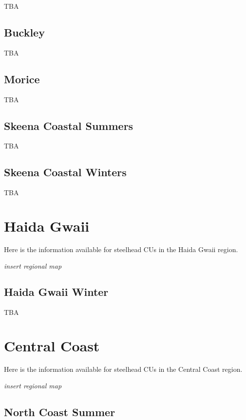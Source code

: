 \documentclass[
]{book}
\begin{document}
TBA

\hypertarget{buckley}{%
\section{Buckley}\label{buckley}}

TBA

\hypertarget{morice}{%
\section{Morice}\label{morice}}

TBA

\hypertarget{skeena-coastal-summers}{%
\section{Skeena Coastal Summers}\label{skeena-coastal-summers}}

TBA

\hypertarget{skeena-coastal-winters}{%
\section{Skeena Coastal Winters}\label{skeena-coastal-winters}}

TBA

\hypertarget{hg}{%
\chapter{Haida Gwaii}\label{hg}}

Here is the information available for steelhead CUs in the Haida Gwaii region.

\emph{insert regional map}

\hypertarget{haida-gwaii-winter}{%
\section{Haida Gwaii Winter}\label{haida-gwaii-winter}}

TBA

\hypertarget{cc}{%
\chapter{Central Coast}\label{cc}}

Here is the information available for steelhead CUs in the Central Coast region.

\emph{insert regional map}

\hypertarget{north-coast-summer}{%
\section{North Coast Summer}\label{north-coast-summer}}
\end{document}
